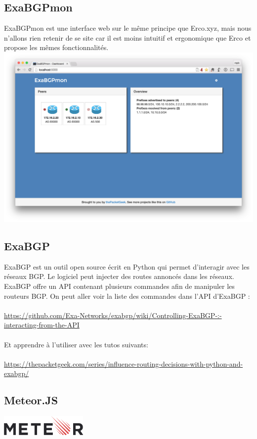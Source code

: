 \subsection{ExaBGPmon}
ExaBGPmon est une interface web sur le même principe que Erco.xyz, mais nous n'allons rien retenir de se site car il est moins intuitif et ergonomique que Erco et propose les mêmes fonctionnalités.
\\
\includegraphics[scale = 0.40]{img/exabgpmon.png}


\subsection{ExaBGP}
ExaBGP est un outil open source écrit en Python qui permet d'interagir avec les réseaux BGP. Le logiciel peut injecter des routes annoncés dans les réseaux. 
ExaBGP offre un API contenant plusieurs commandes afin de manipuler les routeurs BGP. On peut aller voir la liste des commandes dans l'API d'ExaBGP : 
\\
\\
\url{https://github.com/Exa-Networks/exabgp/wiki/Controlling-ExaBGP-:-interacting-from-the-API}
\\
\\
Et apprendre à l'utiliser avec les tutos suivants:
\\
\\
\url{https://thepacketgeek.com/series/influence-routing-decisions-with-python-and-exabgp/}

\subsection{Meteor.JS \cite{Meteor.JS}}
\begin{center}
\includegraphics[height=1cm]{img/Meteor-logo.png}
\end{center}

